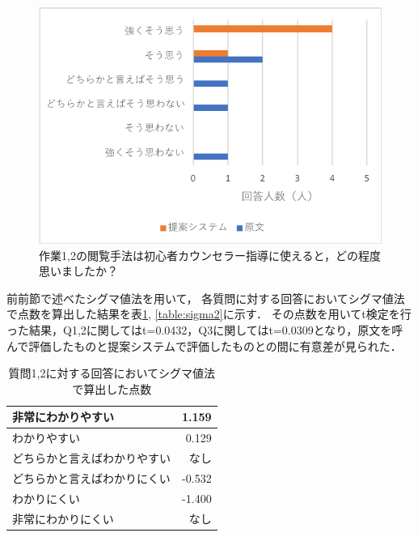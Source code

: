 \documentclass[shuuron]{kuee}
\begin{document}
\begin{figure}
  \begin{center}
    \includegraphics[width=\linewidth]{q3.png}
  \end{center}
  \caption{作業1,2の閲覧手法は初心者カウンセラー指導に使えると，どの程度思いましたか？}
  \label{fig:q3}
\end{figure}

前前節で述べたシグマ値法を用いて，
各質問に対する回答においてシグマ値法で点数を算出した結果を表\ref{table:sigma}, \ref{table:sigma2}に示す．
その点数を用いてt検定を行った結果，Q1,2に関してはt=0.0432，Q3に関してはt=0.0309となり，原文を呼んで評価したものと提案システムで評価したものとの間に有意差が見られた．

\begin{table}
  \caption{質問1,2に対する回答においてシグマ値法で算出した点数}
  \label{table:sigma}
  \begin{center}
    \begin{tabular}{|l|r|} \hline
      非常にわかりやすい & 1.159 \\ \hline
      わかりやすい  & 0.129 \\ \hline
      どちらかと言えばわかりやすい & なし \\ \hline
      どちらかと言えばわかりにくい & -0.532 \\ \hline
      わかりにくい  & -1.400 \\ \hline
      非常にわかりにくい & なし \\ \hline
    \end{tabular}
  \end{center}
\end{table}
\end{document}
